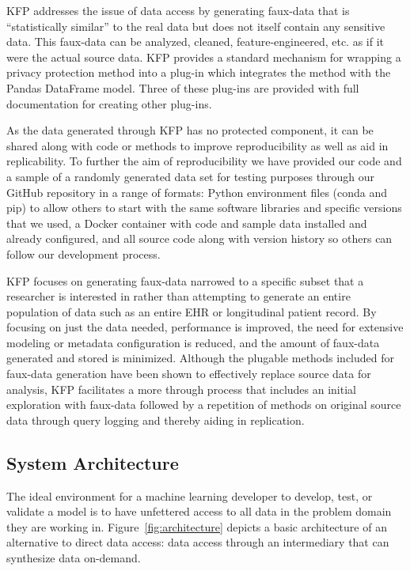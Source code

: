 \documentclass{article}
\begin{document}
KFP addresses the issue of data access by generating faux-data that is ``statistically similar'' to the real data but does not itself contain any sensitive data. This faux-data can be analyzed, cleaned, feature-engineered, etc. as if it were the actual source data. KFP provides a standard mechanism for wrapping a privacy protection method into a plug-in which integrates the method with the Pandas DataFrame model. Three of these plug-ins are provided with full documentation for creating other plug-ins.

As the data generated through KFP has no protected component, it can be shared along with code or methods to improve reproducibility as well as aid in replicability. To further the aim of reproducibility we have provided our code and a sample of a randomly generated data set for testing purposes through our GitHub repository in a range of formats: Python environment files (conda and pip) to allow others to start with the same software libraries and specific versions that we used, a Docker container with code and sample data installed and already configured, and all source code along with version history so others can follow our development process.

KFP focuses on generating faux-data narrowed to a specific subset that a researcher is interested in rather than attempting to generate an entire population of data such as an entire EHR or longitudinal patient record. By focusing on just the data needed, performance is improved, the need for extensive modeling or metadata configuration is reduced, and the amount of faux-data generated and stored is minimized. Although the plugable methods included for faux-data generation have been shown to effectively replace source data for analysis, KFP facilitates a more through process that includes an initial exploration with faux-data followed by a repetition of methods on original source data through query logging and thereby aiding in replication.

\subsection{System Architecture}

The ideal environment for a machine learning developer to develop, test, or validate a model is to have unfettered access to all data in the problem domain they are working in. Figure~\ref{fig:architecture} depicts a basic architecture of an alternative to direct data access: data access through an intermediary that can synthesize data on-demand.
\end{document}
